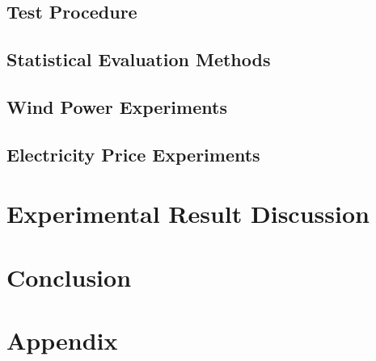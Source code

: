 \documentclass[twoside,11pt,openright]{report}
\begin{document}
\section{Test Procedure}
\label{sec:testProcedure}

\section{Statistical Evaluation Methods}
\label{sec:statisticalEvaluation}

\newpage
\section{Wind Power Experiments}
\label{sec:windProductionExperiments}

\newpage
\section{Electricity Price Experiments}
\label{sec:priceExperiments}

\newpage


\chapter{Experimental Result Discussion}
\label{ch:experimentalResultDiscussions}

\newpage




\chapter{Conclusion}
\label{ch:conclusion}



 



\chapter{Appendix}
\label{ch:appendix}
\end{document}
